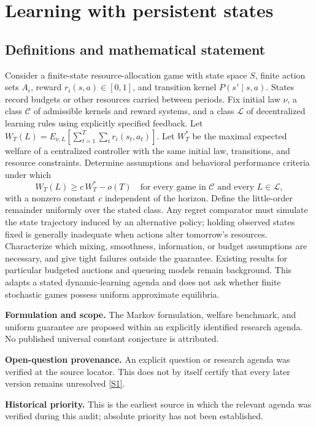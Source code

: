 \documentclass[11pt]{article}
\newcommand{\sref}[2]{\hyperlink{source:#1:#2}{[S#2]}}
\begin{document}
\section*{Learning with persistent states}\label{30007567}
\subsection{Definitions and mathematical statement}
Consider a finite-state resource-allocation game with state space \(S\), finite action sets \(A_i\), reward \(r_i(s,a)\in[0,1]\), and transition kernel \(P(s'\mid s,a)\). States record budgets or other resources carried between periods. Fix initial law \(\nu\), a class \(\mathcal C\) of admissible kernels and reward systems, and a class \(\mathcal L\) of decentralized learning rules using explicitly specified feedback. Let \(W_T(L)=E_{\nu,L}[\sum_{t=1}^T\sum_i r_i(s_t,a_t)]\). Let \(W_T^*\) be the maximal expected welfare of a centralized controller with the same initial law, transitions, and resource constraints. Determine assumptions and behavioral performance criteria under which
\[
 W_T(L)\geq c\,W_T^*-o(T)
 \quad\text{for every game in }\mathcal C\text{ and every }L\in\mathcal L,
\]
with a nonzero constant \(c\) independent of the horizon. Define the little-order remainder uniformly over the stated class. Any regret comparator must simulate the state trajectory induced by an alternative policy; holding observed states fixed is generally inadequate when actions alter tomorrow's resources. Characterize which mixing, smoothness, information, or budget assumptions are necessary, and give tight failures outside the guarantee. Existing results for particular budgeted auctions and queueing models remain background. This adapts a stated dynamic-learning agenda and does not ask whether finite stochastic games possess uniform approximate equilibria.

\par\textbf{Formulation and scope.} The Markov formulation, welfare benchmark, and uniform guarantee are proposed within an explicitly identified research agenda. No published universal constant conjecture is attributed.

\par\textbf{Open-question provenance.} An explicit question or research agenda was verified at the source locator. This does not by itself certify that every later version remains unresolved \sref{30007567}{1}.

\par\textbf{Historical priority.} This is the earliest source in which the relevant agenda was verified during this audit; absolute priority has not been established.
\end{document}
